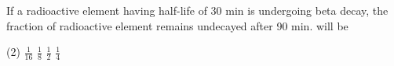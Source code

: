 \item If a radioactive element having half-life of 30 min is undergoing beta decay, the fraction of radioactive element remains undecayed after 90 min. will be
    \begin{tasks}(2)
        \task $\frac{1}{16}$
        \task $\frac{1}{8}$
        \task $\frac{1}{2}$
        \task $\frac{1}{4}$
    \end{tasks}